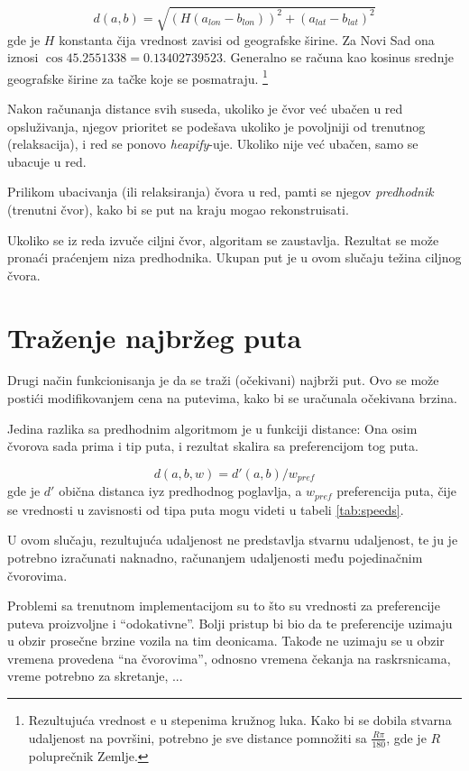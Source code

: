 \documentclass[a4paper]{article}
\begin{document}
\[
    d (a, b) = \sqrt{ ( H ( a_{lon} - b_{lon} ) ) ^ 2 + ( a_{lat} - b_{lat} ) ^ 2 }
\]
gde je $H$ konstanta čija vrednost zavisi od geografske širine. Za Novi Sad ona iznosi $ \cos 45.2551338 = 0.13402739523 $. Generalno se računa kao kosinus srednje geografske širine za tačke koje se posmatraju. \footnote{Rezultujuća vrednost e u stepenima kružnog luka. Kako bi se dobila stvarna udaljenost na površini, potrebno je sve distance pomnožiti sa $\frac{R \pi}{180}$, gde je $R$ poluprečnik Zemlje.}

Nakon računanja distance svih suseda, ukoliko je čvor već ubačen u red opsluživanja, njegov prioritet se podešava ukoliko je povoljniji od trenutnog (relaksacija), i red se ponovo \emph{heapify}-uje. Ukoliko nije već ubačen, samo se ubacuje u red.

Prilikom ubacivanja (ili relaksiranja) čvora u red, pamti se njegov \emph{predhodnik} (trenutni čvor), kako bi se put na kraju mogao rekonstruisati.

Ukoliko se iz reda izvuče ciljni čvor, algoritam se zaustavlja. Rezultat se može pronaći praćenjem niza predhodnika. Ukupan put je u ovom slučaju težina ciljnog čvora.

\section{Traženje najbržeg puta}

Drugi način funkcionisanja je da se traži (očekivani) najbrži put. Ovo se može postići modifikovanjem cena na putevima, kako bi se uračunala očekivana brzina.

Jedina razlika sa predhodnim algoritmom je u funkciji distance: Ona osim čvorova sada prima i tip puta, i rezultat skalira sa preferencijom tog puta.

\[
    d(a, b, w) = d'(a, b) / w_{pref}
\]
gde je $d'$ obična distanca iyz predhodnog poglavlja, a $w_{pref}$ preferencija puta, čije se vrednosti u zavisnosti od tipa puta mogu videti u tabeli \ref{tab:speeds}.

U ovom slučaju, rezultujuća udaljenost ne predstavlja stvarnu udaljenost, te ju je potrebno izračunati naknadno, računanjem udaljenosti među pojedinačnim čvorovima.

Problemi sa trenutnom implementacijom su to što su vrednosti za preferencije puteva proizvoljne i ``odokativne''. Bolji pristup bi bio da te preferencije uzimaju u obzir prosečne brzine vozila na tim deonicama. Takođe ne uzimaju se u obzir vremena provedena ``na čvorovima'', odnosno vremena čekanja na raskrsnicama, vreme potrebno za skretanje, ...
\end{document}
